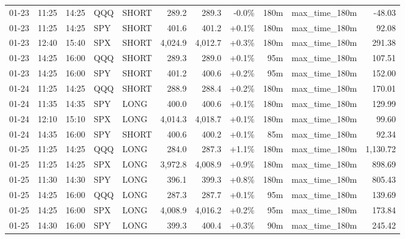 \documentclass[11pt,a4paper,twoside]{article}
\begin{document}
\begin{center}
\begin{longtable}{>{\color{txtmain}}l l l l l r r r r >{\color{txtmain}}l r}
01-23 & 11:25 & 14:25 & QQQ & SHORT & 289.2 & 289.3 & \textcolor{lossred}{-0.0\%} & 180m & max\_time\_180m & \textcolor{lossred}{-48.03} \\
01-23 & 11:25 & 14:25 & SPY & SHORT & 401.6 & 401.2 & \textcolor{wingreen}{+0.1\%} & 180m & max\_time\_180m & \textcolor{wingreen}{92.08} \\
01-23 & 12:40 & 15:40 & SPX & SHORT & 4,024.9 & 4,012.7 & \textcolor{wingreen}{+0.3\%} & 180m & max\_time\_180m & \textcolor{wingreen}{291.38} \\
01-23 & 14:25 & 16:00 & QQQ & SHORT & 289.3 & 289.0 & \textcolor{wingreen}{+0.1\%} & 95m & max\_time\_180m & \textcolor{wingreen}{107.51} \\
01-23 & 14:25 & 16:00 & SPY & SHORT & 401.2 & 400.6 & \textcolor{wingreen}{+0.2\%} & 95m & max\_time\_180m & \textcolor{wingreen}{152.00} \\
01-24 & 11:25 & 14:25 & QQQ & SHORT & 288.9 & 288.4 & \textcolor{wingreen}{+0.2\%} & 180m & max\_time\_180m & \textcolor{wingreen}{170.01} \\
01-24 & 11:35 & 14:35 & SPY & LONG & 400.0 & 400.6 & \textcolor{wingreen}{+0.1\%} & 180m & max\_time\_180m & \textcolor{wingreen}{129.99} \\
01-24 & 12:10 & 15:10 & SPX & LONG & 4,014.3 & 4,018.7 & \textcolor{wingreen}{+0.1\%} & 180m & max\_time\_180m & \textcolor{wingreen}{99.60} \\
01-24 & 14:35 & 16:00 & SPY & SHORT & 400.6 & 400.2 & \textcolor{wingreen}{+0.1\%} & 85m & max\_time\_180m & \textcolor{wingreen}{92.34} \\
01-25 & 11:25 & 14:25 & QQQ & LONG & 284.0 & 287.3 & \textcolor{wingreen}{+1.1\%} & 180m & max\_time\_180m & \textcolor{wingreen}{1,130.72} \\
01-25 & 11:25 & 14:25 & SPX & LONG & 3,972.8 & 4,008.9 & \textcolor{wingreen}{+0.9\%} & 180m & max\_time\_180m & \textcolor{wingreen}{898.69} \\
01-25 & 11:30 & 14:30 & SPY & LONG & 396.1 & 399.3 & \textcolor{wingreen}{+0.8\%} & 180m & max\_time\_180m & \textcolor{wingreen}{805.43} \\
01-25 & 14:25 & 16:00 & QQQ & LONG & 287.3 & 287.7 & \textcolor{wingreen}{+0.1\%} & 95m & max\_time\_180m & \textcolor{wingreen}{139.69} \\
01-25 & 14:25 & 16:00 & SPX & LONG & 4,008.9 & 4,016.2 & \textcolor{wingreen}{+0.2\%} & 95m & max\_time\_180m & \textcolor{wingreen}{173.84} \\
01-25 & 14:30 & 16:00 & SPY & LONG & 399.3 & 400.4 & \textcolor{wingreen}{+0.3\%} & 90m & max\_time\_180m & \textcolor{wingreen}{245.42} \\

\end{longtable}
\end{center}
\end{document}
